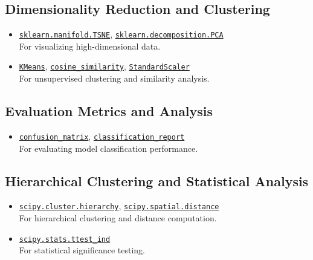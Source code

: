 \documentclass[11pt,a4paper,oneside]{report}
\begin{document}
\subsection*{Dimensionality Reduction and Clustering}
\begin{itemize}
    \item \href{https://scikit-learn.org/stable/modules/generated/sklearn.manifold.TSNE.html}{\texttt{sklearn.manifold.TSNE}}, \href{https://scikit-learn.org/stable/modules/generated/sklearn.decomposition.PCA.html}{\texttt{sklearn.decomposition.PCA}} \\
    For visualizing high-dimensional data.
    
    \item \href{https://scikit-learn.org/stable/modules/generated/sklearn.cluster.KMeans.html}{\texttt{KMeans}}, \href{https://scikit-learn.org/stable/modules/generated/sklearn.metrics.pairwise.cosine_similarity.html}{\texttt{cosine\_similarity}}, \href{https://scikit-learn.org/stable/modules/generated/sklearn.preprocessing.StandardScaler.html}{\texttt{StandardScaler}} \\
    For unsupervised clustering and similarity analysis.
\end{itemize}

\subsection*{Evaluation Metrics and Analysis}
\begin{itemize}
    \item \href{https://scikit-learn.org/stable/modules/generated/sklearn.metrics.confusion_matrix.html}{\texttt{confusion\_matrix}}, \href{https://scikit-learn.org/stable/modules/generated/sklearn.metrics.classification_report.html}{\texttt{classification\_report}} \\
    For evaluating model classification performance.
\end{itemize}

\subsection*{Hierarchical Clustering and Statistical Analysis}
\begin{itemize}
    \item \href{https://docs.scipy.org/doc/scipy/reference/cluster.hierarchy.html}{\texttt{scipy.cluster.hierarchy}}, \href{https://docs.scipy.org/doc/scipy/reference/spatial.distance.html}{\texttt{scipy.spatial.distance}} \\
    For hierarchical clustering and distance computation.
    
    \item \href{https://docs.scipy.org/doc/scipy/reference/generated/scipy.stats.ttest_ind.html}{\texttt{scipy.stats.ttest\_ind}} \\
    For statistical significance testing.
\end{itemize}
\end{document}
